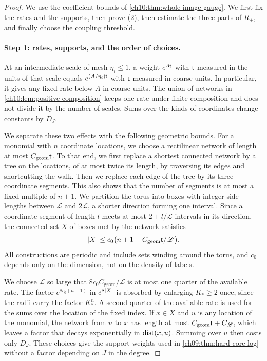 \begin{proof}
We use the coefficient bounds of \cref{ch10:thm:whole-image-gauge}. We first fix the rates and the supports, then prove (2), then estimate the three parts of $R_+$, and finally choose the coupling threshold.

\paragraph{Step 1: rates, supports, and the order of choices.}
At an intermediate scale of mesh $\eta_i\le1$, a weight $e^{A\mathsf t}$ with $\mathsf t$ measured in the units of that scale equals $e^{(A/\eta_i)\mathsf t}$ with $\mathsf t$ measured in coarse units. In particular, it gives any fixed rate below $A$ in coarse units. The union of networks in \cref{ch10:lem:positive-composition} keeps one rate under finite composition and does not divide it by the number of scales. Sums over the kinds of coordinates change constants by $D_J$.

We separate these two effects with the following geometric bounds. For a monomial with $n$ coordinate locations, we choose a rectilinear network of length at most $C_{\mathrm{geom}}\mathsf t$. To that end, we first replace a shortest connected network by a tree on the locations, of at most twice its length, by traversing its edges and shortcutting the walk. Then we replace each edge of the tree by its three coordinate segments. This also shows that the number of segments is at most a fixed multiple of $n+1$. We partition the torus into boxes with integer side lengths between $\mathscr L$ and $2\mathscr L$, a shorter direction forming one interval. Since a coordinate segment of length $l$ meets at most $2+l/\mathscr L$ intervals in its direction, the connected set $X$ of boxes met by the network satisfies
\begin{equation}\label{ch10:eq:hull-size}
 \lvert X\rvert\le c_0\bigl(n+1+C_{\mathrm{geom}}\mathsf t/\mathscr L\bigr).
\end{equation}
All constructions are periodic and include sets winding around the torus, and $c_0$ depends only on the dimension, not on the density of labels.

We choose $\mathscr L$ so large that $8c_0C_{\mathrm{geom}}/\mathscr L$ is at most one quarter of the available rate. The factor $e^{8c_0(n+1)}$ in $e^{8\lvert X\rvert}$ is absorbed by enlarging $K_*\ge2$ once, since the radii carry the factor $K_*^n$. A second quarter of the available rate is used for the sums over the location of the fixed index. If $x\in X$ and $u$ is any location of the monomial, the network from $u$ to $x$ has length at most $C_{\mathrm{geom}}\mathsf t+C_{\mathscr L}$, which leaves a factor that decays exponentially in $\operatorname{dist}(x,u)$. Summing over $u$ then costs only $D_J$. These choices give the support weights used in \cref{ch09:thm:hard-core-log} without a factor depending on $J$ in the degree.


\end{proof}
